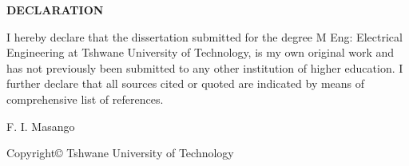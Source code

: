 
{\large \textbf{DECLARATION}}\par


I hereby declare that the dissertation submitted for the degree M Eng: Electrical Engineering at Tshwane University of Technology, is my own original work and has not previously been submitted to any other institution of higher education. I further declare that all sources cited or quoted are indicated by means of comprehensive list of references.\par

F. I. Masango
\vfill

Copyright© Tshwane University of Technology

	

